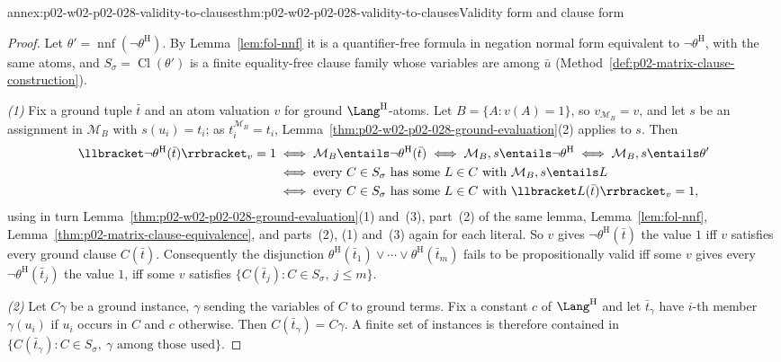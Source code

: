 \begin{annexitem}{annex:p02-w02-p02-028-validity-to-clauses}{thm:p02-w02-p02-028-validity-to-clauses}{Validity form and clause form}
\begin{proof}
Let \(\theta'=\operatorname{nnf}(\neg\theta^{\mathrm H})\).  By
Lemma~\ref{lem:fol-nnf} it is a quantifier-free formula in negation normal
form equivalent to \(\neg\theta^{\mathrm H}\), with the same atoms, and
\(S_\sigma=\operatorname{Cl}(\theta')\) is a finite equality-free clause
family whose variables are among \(\bar u\)
(Method~\ref{def:p02-matrix-clause-construction}).

\emph{(1)}  Fix a ground tuple \(\bar t\) and an atom valuation \(v\) for
ground \(\Lang^{\mathrm H}\)-atoms.  Let \(B=\{A:v(A)=1\}\), so
\(v_{\mathcal M_B}=v\), and let \(s\) be an assignment in \(\mathcal M_B\)
with \(s(u_i)=t_i\); as \(t_i^{\mathcal M_B}=t_i\), Lemma~\ref{thm:p02-w02-p02-028-ground-evaluation}(2)
applies to \(s\).  Then
\[
\begin{aligned}
\llbracket\neg\theta^{\mathrm H}(\bar t)\rrbracket_v=1
 &\iff \mathcal M_B\entails\neg\theta^{\mathrm H}(\bar t)
 \iff \mathcal M_B,s\entails\neg\theta^{\mathrm H}
 \iff \mathcal M_B,s\entails\theta'\\
 &\iff \text{every }C\in S_\sigma\text{ has some }L\in C\text{ with }\mathcal M_B,s\entails L\\
 &\iff \text{every }C\in S_\sigma\text{ has some }L\in C\text{ with }\llbracket L(\bar t)\rrbracket_v=1,
\end{aligned}
\]
using in turn Lemma~\ref{thm:p02-w02-p02-028-ground-evaluation}(1) and~(3),
part~(2) of the same lemma, Lemma~\ref{lem:fol-nnf},
Lemma~\ref{thm:p02-matrix-clause-equivalence}, and parts~(2), (1) and~(3)
again for each literal.  So \(v\) gives \(\neg\theta^{\mathrm H}(\bar t)\)
the value \(1\) iff \(v\) satisfies every ground clause \(C(\bar t)\).
Consequently the disjunction
\(\theta^{\mathrm H}(\bar t_1)\lor\cdots\lor\theta^{\mathrm H}(\bar t_m)\)
fails to be propositionally valid iff some \(v\) gives every
\(\neg\theta^{\mathrm H}(\bar t_j)\) the value \(1\), iff some \(v\)
satisfies \(\{C(\bar t_j):C\in S_\sigma,\ j\leq m\}\).

\emph{(2)}  Let \(C\gamma\) be a ground instance, \(\gamma\) sending the
variables of \(C\) to ground terms.  Fix a constant \(c\) of
\(\Lang^{\mathrm H}\) and let \(\bar t_\gamma\) have \(i\)-th member
\(\gamma(u_i)\) if \(u_i\) occurs in \(C\) and \(c\) otherwise.  Then
\(C(\bar t_\gamma)=C\gamma\).  A finite set of instances is therefore
contained in \(\{C(\bar t_\gamma):C\in S_\sigma,\ \gamma\text{ among those
used}\}\).


\end{proof}
\end{annexitem}
